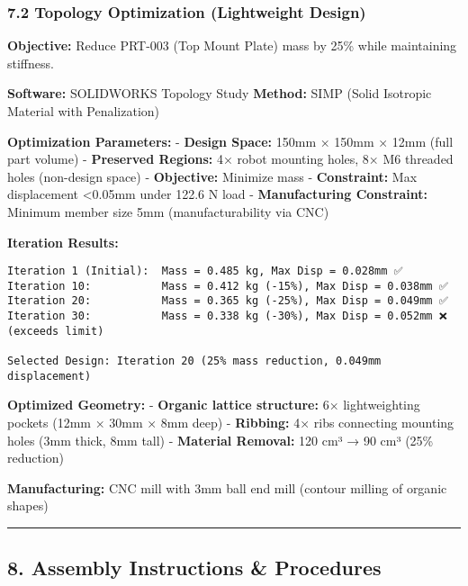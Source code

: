 \documentclass[
]{article}
\begin{document}
\hypertarget{topology-optimization-lightweight-design}{%
\subsubsection{7.2 Topology Optimization (Lightweight
Design)}\label{topology-optimization-lightweight-design}}

\textbf{Objective:} Reduce PRT-003 (Top Mount Plate) mass by 25\% while
maintaining stiffness.

\textbf{Software:} SOLIDWORKS Topology Study \textbf{Method:} SIMP
(Solid Isotropic Material with Penalization)

\textbf{Optimization Parameters:} - \textbf{Design Space:} 150mm × 150mm
× 12mm (full part volume) - \textbf{Preserved Regions:} 4× robot
mounting holes, 8× M6 threaded holes (non-design space) -
\textbf{Objective:} Minimize mass - \textbf{Constraint:} Max
displacement \textless0.05mm under 122.6 N load - \textbf{Manufacturing
Constraint:} Minimum member size 5mm (manufacturability via CNC)

\textbf{Iteration Results:}

\begin{verbatim}
Iteration 1 (Initial):  Mass = 0.485 kg, Max Disp = 0.028mm ✅
Iteration 10:           Mass = 0.412 kg (-15%), Max Disp = 0.038mm ✅
Iteration 20:           Mass = 0.365 kg (-25%), Max Disp = 0.049mm ✅
Iteration 30:           Mass = 0.338 kg (-30%), Max Disp = 0.052mm ❌ (exceeds limit)

Selected Design: Iteration 20 (25% mass reduction, 0.049mm displacement)
\end{verbatim}

\textbf{Optimized Geometry:} - \textbf{Organic lattice structure:} 6×
lightweighting pockets (12mm × 30mm × 8mm deep) - \textbf{Ribbing:} 4×
ribs connecting mounting holes (3mm thick, 8mm tall) - \textbf{Material
Removal:} 120 cm³ → 90 cm³ (25\% reduction)

\textbf{Manufacturing:} CNC mill with 3mm ball end mill (contour milling
of organic shapes)

\begin{center}\rule{0.5\linewidth}{0.5pt}\end{center}

\hypertarget{assembly-instructions-procedures}{%
\subsection{8. Assembly Instructions \&
Procedures}\label{assembly-instructions-procedures}}
\end{document}
